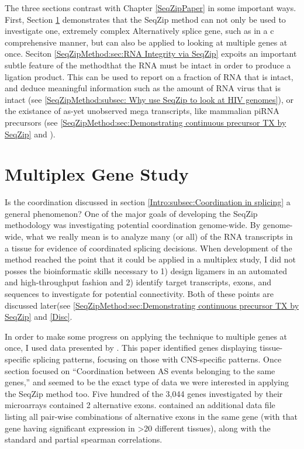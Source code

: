   The three sections contrast with Chapter \ref{SeqZipPaper} in some important ways. First, Section \ref{SeqZipMethod:sec:Multiplex Gene Study} demonstrates that the SeqZip method can not only be used to investigate one, extremely complex Alternatively splice gene, such as \dscam{} in a c comprehensive manner, but can also be applied to looking at multiple genes at once. Seciton \ref{SeqZipMethod:sec:RNA Integrity via SeqZip} expoits an important subtle feature of the method\textemdash that the RNA must be intact in order to produce a ligation product. This can be used to report on a fraction of RNA that is intact, and deduce meaningful information such as the amount of RNA virus that is intact (see \ref{SeqZipMethod:subsec: Why use SeqZip to look at HIV genomes}), or the existance of as-yet unobserved mega transcripts, like mammalian piRNA precursors (see \ref{SeqZipMethod:sec:Demonstrating continuous precursor TX by SeqZip} and \citep{Li2013h,Li2013}).

\section{Multiplex Gene Study}
  \label{SeqZipMethod:sec:Multiplex Gene Study}

  Is the coordination discussed in section \ref{Intro:subsec:Coordination in splicing} a general phenomenon? One of the major goals of developing the SeqZip methodology was investigating potential coordination genome-wide. By genome-wide, what we really mean is to analyze many (or all) of the RNA transcripts in a tissue for evidence of coordinated splicing decisions. When development of the method reached the point that it could be applied in a multiplex study, I did not posses the bioinformatic skills necessary to 1) design ligamers in an automated and high-throughput fashion and 2) identify target transcripts, exons, and sequences to investigate for potential connectivity. Both of these points are discussed later(see \ref{SeqZipMethod:sec:Demonstrating continuous precursor TX by SeqZip} and \ref{Disc}. 

  In order to make some progress on applying the technique to multiple genes at once, I used data presented by \citet{Fagnani2007}. This paper identified genes displaying tissue-specific splicing patterns, focusing on those with CNS-specific patterns. Once section focused on ``Coordination between AS events belonging to the same genes,'' and seemed to be the exact type of data we were interested in applying the SeqZip method too. Five hundred of the 3,044 genes investigated by their microarrays contained 2 alternative exons. \citet{Fagnani2007} contained an additional data file listing all pair-wise combinations of alternative exons in the same gene (with that gene having significant expression in >20 different tissues), along with the standard and partial spearman correlations. 

